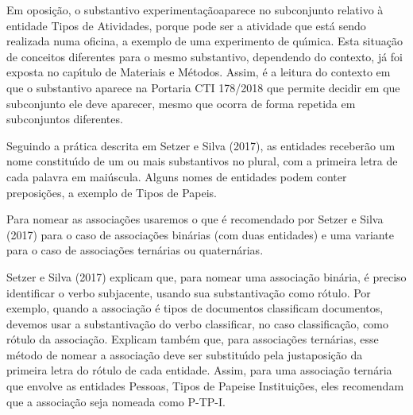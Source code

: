 \documentclass[
12pt,		%
openright,	%
twoside,  %
a4paper,			%
chapter=TITLE,		%
english,			%
french,				%
spanish,			%
brazil				%
]{USPSC-classe/USPSC}
\begin{document}
Em oposi\c{c}\~ao, o substantivo \textquotedbl experimenta\c{c}\~ao\textquotedbl  aparece no subconjunto relativo \`a entidade \textquotedbl Tipos de Atividades\textquotedbl , porque pode ser a atividade que est\'a sendo realizada numa oficina, a exemplo de uma experimento de qu\'{\i}mica. Esta situa\c{c}\~ao de conceitos diferentes para o mesmo substantivo, dependendo do contexto, j\'a foi exposta no cap\'{\i}tulo de Materiais e M\'etodos. Assim, \'e a leitura do contexto em que o substantivo aparece na Portaria CTI 178/2018 que permite decidir em que subconjunto ele deve aparecer, mesmo que ocorra de forma repetida em subconjuntos diferentes.









Seguindo a pr\'atica descrita em  Setzer e Silva (2017), as entidades receber\~ao um nome constitu\'{\i}do de um ou mais substantivos no plural, com a primeira letra de cada palavra em mai\'uscula. Alguns nomes de entidades podem conter preposi\c{c}\~oes, a exemplo de \textquotedbl Tipos de Papeis\textquotedbl .









Para nomear as associa\c{c}\~oes usaremos o que \'e recomendado por Setzer e Silva (2017) para o caso de associa\c{c}\~oes bin\'arias (com duas entidades) e uma variante para o caso de associa\c{c}\~oes tern\'arias ou quatern\'arias.









 Setzer e Silva (2017) explicam que, para nomear uma associa\c{c}\~ao bin\'aria, \'e preciso identificar o verbo subjacente, usando sua substantiva\c{c}\~ao como r\'otulo. Por exemplo, quando a associa\c{c}\~ao \'e \textquotedbl tipos de documentos classificam documentos\textquotedbl , devemos usar a substantiva\c{c}\~ao do verbo \textquotedbl classificar\textquotedbl , no caso \textquotedbl classifica\c{c}\~ao\textquotedbl , como r\'otulo da associa\c{c}\~ao. Explicam tamb\'em que, para associa\c{c}\~oes tern\'arias, esse m\'etodo de nomear a associa\c{c}\~ao deve ser substitu\'{\i}do pela justaposi\c{c}\~ao da primeira letra do r\'otulo de cada entidade. Assim, para uma associa\c{c}\~ao tern\'aria que envolve as entidades \textquotedbl Pessoas\textquotedbl , \textquotedbl Tipos de Papeis\textquotedbl  e \textquotedbl Institui\c{c}\~oes\textquotedbl , eles recomendam que a associa\c{c}\~ao seja nomeada como \textquotedbl P-TP-I\textquotedbl .
\end{document}
